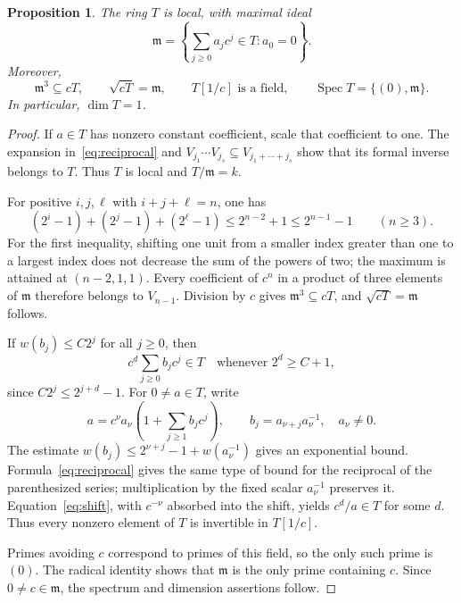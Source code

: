 \documentclass[11pt,reqno]{amsart}
\numberwithin{equation}{section}
\theoremstyle{plain}
\newtheorem{proposition}[theorem]{Proposition}
\theoremstyle{definition}
\theoremstyle{remark}
\DeclareMathOperator{\Spec}{Spec}
\newcommand{\m}{\mathfrak m}
\begin{document}
\begin{proposition}\label{prop:local}
The ring $T$ is local, with maximal ideal
\[
 \m=\left\{\sum_{j\ge0}a_jc^j\in T:a_0=0\right\}.
\]
Moreover,
\begin{equation}\label{eq:local-properties}
 \m^3\subseteq cT,\qquad \sqrt{cT}=\m,\qquad
 T[1/c]\text{ is a field},\qquad \Spec T=\{(0),\m\}.
\end{equation}
In particular, $\dim T=1$.
\end{proposition}

\begin{proof}
If $a\in T$ has nonzero constant coefficient, scale that
coefficient to one. The expansion in~\eqref{eq:reciprocal} and
$V_{j_1}\cdots V_{j_s}\subseteq V_{j_1+\cdots+j_s}$ show that
its formal inverse belongs to $T$. Thus $T$ is local and $T/\m=k$.

For positive $i,j,\ell$ with $i+j+\ell=n$, one has
\begin{equation}\label{eq:cube-estimate}
 (2^i-1)+(2^j-1)+(2^\ell-1)
 \le2^{n-2}+1\le2^{n-1}-1\qquad(n\ge3).
\end{equation}
For the first inequality, shifting one unit from a smaller index
greater than one to a largest index does not decrease the sum of
the powers of two; the maximum is attained at $(n-2,1,1)$.
Every coefficient of $c^n$ in a product of three elements of $\m$
therefore belongs to $V_{n-1}$. Division by $c$ gives
$\m^3\subseteq cT$, and $\sqrt{cT}=\m$ follows.

If $w(b_j)\le C2^j$ for all $j\ge0$, then
\begin{equation}\label{eq:shift}
 c^d\sum_{j\ge0}b_jc^j\in T
 \quad\text{whenever }2^d\ge C+1,
\end{equation}
since $C2^j\le2^{j+d}-1$. For $0\ne a\in T$, write
\[
 a=c^\nu a_\nu\left(1+\sum_{j\ge1}b_jc^j\right),
 \qquad b_j=a_{\nu+j}a_\nu^{-1},\quad a_\nu\ne0.
\]
The estimate
$w(b_j)\le2^{\nu+j}-1+w(a_\nu^{-1})$ gives an exponential
bound. Formula~\eqref{eq:reciprocal} gives the same type of bound
for the reciprocal of the parenthesized series; multiplication by
the fixed scalar $a_\nu^{-1}$ preserves it.
Equation~\eqref{eq:shift}, with $c^{-\nu}$ absorbed into the
shift, yields $c^d/a\in T$ for some $d$.
Thus every nonzero element of $T$ is invertible in $T[1/c]$.

Primes avoiding $c$ correspond to primes of this field, so the only
such prime is $(0)$. The radical identity shows that $\m$ is the
only prime containing $c$. Since $0\ne c\in\m$, the spectrum
and dimension assertions follow.
\end{proof}
\end{document}
